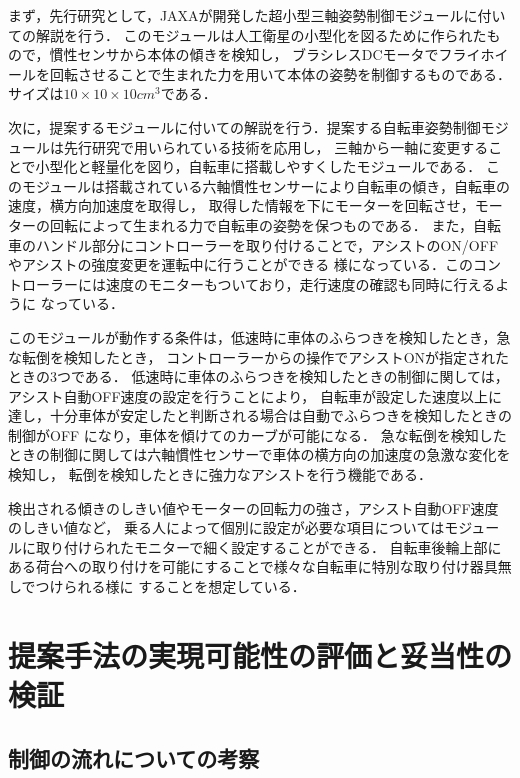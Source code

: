 \documentclass[uplatex,dvipdfmx]{jsarticle}
\begin{document}
まず，先行研究として，JAXAが開発した超小型三軸姿勢制御モジュールに付いての解説を行う．\cite{jaxaModule}
このモジュールは人工衛星の小型化を図るために作られたもので，慣性センサから本体の傾きを検知し，
ブラシレスDCモータでフライホイールを回転させることで生まれた力を用いて本体の姿勢を制御するものである．
サイズは$10×10×10 {cm}^3$である．

次に，提案するモジュールに付いての解説を行う．提案する自転車姿勢制御モジュールは先行研究で用いられている技術を応用し，
三軸から一軸に変更することで小型化と軽量化を図り，自転車に搭載しやすくしたモジュールである．
このモジュールは搭載されている六軸慣性センサーにより自転車の傾き，自転車の速度，横方向加速度を取得し，
取得した情報を下にモーターを回転させ，モーターの回転によって生まれる力で自転車の姿勢を保つものである．
また，自転車のハンドル部分にコントローラーを取り付けることで，アシストのON/OFFやアシストの強度変更を運転中に行うことができる
様になっている．このコントローラーには速度のモニターもついており，走行速度の確認も同時に行えるように
なっている．

このモジュールが動作する条件は，低速時に車体のふらつきを検知したとき，急な転倒を検知したとき，
コントローラーからの操作でアシストONが指定されたときの3つである．
低速時に車体のふらつきを検知したときの制御に関しては，アシスト自動OFF速度の設定を行うことにより，
自転車が設定した速度以上に達し，十分車体が安定したと判断される場合は自動でふらつきを検知したときの制御がOFF
になり，車体を傾けてのカーブが可能になる．
急な転倒を検知したときの制御に関しては六軸慣性センサーで車体の横方向の加速度の急激な変化を検知し，
転倒を検知したときに強力なアシストを行う機能である．

検出される傾きのしきい値やモーターの回転力の強さ，アシスト自動OFF速度のしきい値など，
乗る人によって個別に設定が必要な項目についてはモジュールに取り付けられたモニターで細く設定することができる．
自転車後輪上部にある荷台への取り付けを可能にすることで様々な自転車に特別な取り付け器具無しでつけられる様に
することを想定している．

\section{提案手法の実現可能性の評価と妥当性の検証}
\subsection{制御の流れについての考察}
\end{document}
